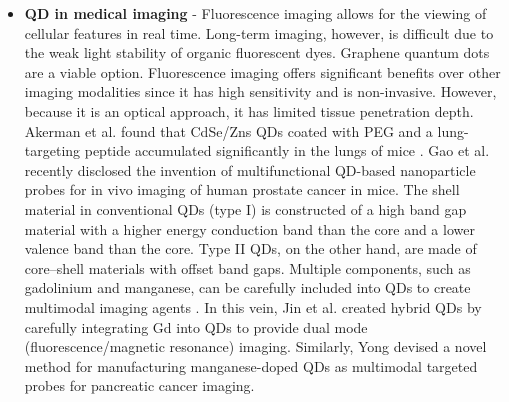 \documentclass[12pt]{article}
\begin{document}
\begin{itemize}
\item \textbf{QD in medical imaging } - Fluorescence imaging allows for the viewing of cellular features in real time. Long-term imaging, however, is difficult due to the weak light stability of organic fluorescent dyes. Graphene quantum dots are a viable option. Fluorescence imaging offers significant benefits over other imaging modalities since it has high sensitivity and is non-invasive. However, because it is an optical approach, it has limited tissue penetration depth. Akerman et al. found that CdSe/Zns QDs coated with PEG and a lung-targeting peptide accumulated significantly in the lungs of mice .
Gao et al. recently disclosed the invention of multifunctional QD-based nanoparticle probes for in vivo imaging of human prostate cancer in mice. The shell material in conventional QDs (type I) is constructed of a high band gap material with a higher energy conduction band than the core and a lower valence band than the core. Type II QDs, on the other hand, are made of core–shell materials with offset band gaps. Multiple components, such as gadolinium and manganese, can be carefully included into QDs to create multimodal imaging agents . In this vein, Jin et al. created hybrid QDs by carefully integrating Gd into QDs to provide dual mode (fluorescence/magnetic resonance) imaging. Similarly, Yong devised a novel method for manufacturing manganese-doped QDs as multimodal targeted probes for pancreatic cancer imaging.
\end{itemize}
\end{document}
